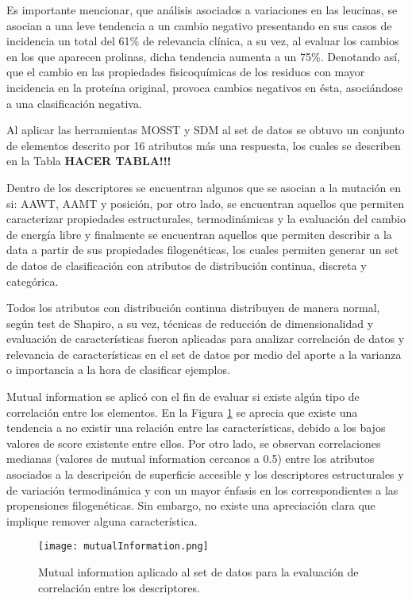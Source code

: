 Es importante mencionar, que análisis asociados a variaciones en las leucinas, se asocian a una leve tendencia a un cambio negativo presentando en sus casos de incidencia un total del 61\% de relevancia clínica, a su vez, al evaluar los cambios en los que aparecen prolinas, dicha tendencia aumenta a un 75\%. Denotando así, que el cambio en las propiedades fisicoquímicas de los residuos con mayor incidencia en la proteína original, provoca cambios negativos en ésta, asociándose a una clasificación negativa.

Al aplicar las herramientas MOSST y SDM al set de datos se obtuvo un conjunto de elementos descrito por 16 atributos más una respuesta, los cuales se describen en la Tabla \textbf{HACER TABLA!!!}

Dentro de los descriptores se encuentran algunos que se asocian a la mutación en si: AAWT, AAMT y posición, por otro lado, se encuentran aquellos que permiten caracterizar propiedades estructurales, termodinámicas y la evaluación del cambio de energía libre y finalmente se encuentran aquellos que permiten describir a la data a partir de sus propiedades filogenéticas, los cuales permiten generar un set de datos de clasificación con atributos de distribución continua, discreta y categórica.

Todos los atributos con distribución continua distribuyen de manera normal, según test de Shapiro, a su vez, técnicas de reducción de dimensionalidad y evaluación de características fueron aplicadas para analizar correlación de datos y relevancia de características en el set de datos por medio del aporte a la varianza o importancia a la hora de clasificar ejemplos.

Mutual information se aplicó con el fin de evaluar si existe algún tipo de correlación entre los elementos. En la Figura \ref{mutualInformation} se aprecia que existe una tendencia a no existir una relación entre las características, debido a los bajos valores de score existente entre ellos. Por otro lado, se observan correlaciones medianas (valores de mutual information cercanos a 0.5) entre los atributos asociados a la descripción de superficie accesible y los descriptores estructurales y de variación termodinámica y con un mayor énfasis en los correspondientes a las propensiones filogenéticas. Sin embargo, no existe una apreciación clara que implique remover alguna característica. 

\begin{figure}[!h]
	\centering
	\texttt{[image: mutualInformation.png]}
	\caption{Mutual information aplicado al set de datos para la evaluación de correlación entre los descriptores.}
	\label{mutualInformation}
\end{figure}

